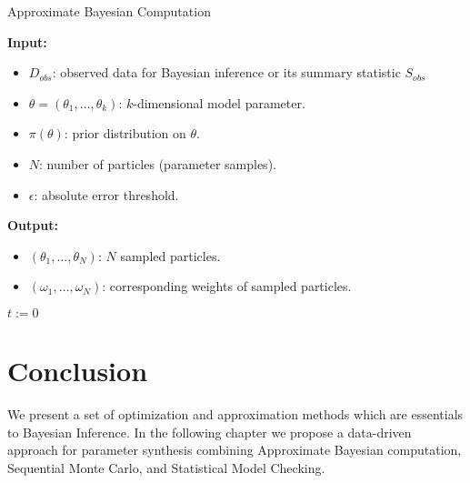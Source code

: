 \begin{algorithm}[H]
    \caption{Approximate Bayesian Computation}
    \label{abcalg}
    \hspace*{\algorithmicindent} \textbf{Input:}
    \begin{itemize}
        \item $D_{obs}$: observed data for Bayesian inference or its summary statistic $S_{obs}$
        \item $\theta=(\theta_1,\ldots,\theta_k)$: $k$-dimensional model parameter.
        \item $\pi(\theta)$: prior distribution on $\theta$.
        \item $N$: number of particles (parameter samples).
        \item $\epsilon$: absolute error threshold.
    \end{itemize}
    \hspace*{\algorithmicindent} \textbf{Output:}
    \begin{itemize}
        \item $(\theta_1,\ldots,\theta_N)$: $N$ sampled particles.
        \item $(\omega_1,\ldots,\omega_N)$: corresponding weights of sampled particles.
    \end{itemize}
    \begin{algorithmic}[1]
        \State $t:=0$  \EndWhile \EndProcedure
    \end{algorithmic}
\end{algorithm}



\section{Conclusion}
We present a set of optimization and approximation methods which are essentials to Bayesian
Inference. In the following chapter we propose a data-driven approach for parameter synthesis
combining Approximate Bayesian computation, Sequential Monte Carlo, and Statistical Model Checking.

